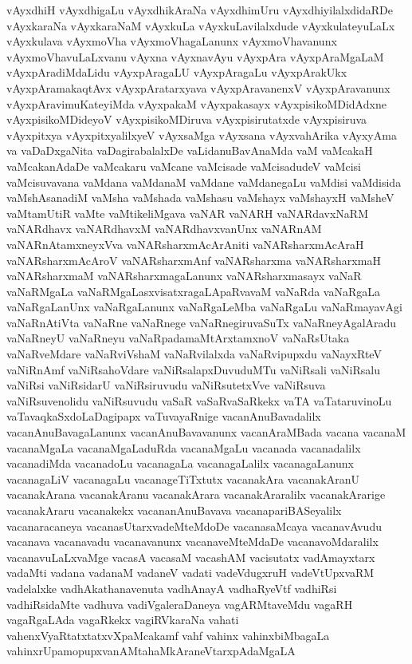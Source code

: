 {vAyxdhiH
vAyxdhigaLu
vAyxdhikAraNa
vAyxdhimUru
vAyxdhiyilalxdidaRDe
vAyxkaraNa
vAyxkaraNaM
vAyxkuLa
vAyxkuLavilalxdude
vAyxkulateyuLaLx
vAyxkulava
vAyxmoVha
vAyxmoVhagaLanunx
vAyxmoVhavanunx
vAyxmoVhavuLaLxvanu
vAyxna
vAyxnavAyu
vAyxpAra
vAyxpAraMgaLaM
vAyxpAradiMdaLidu
vAyxpAragaLU
vAyxpAragaLu
vAyxpArakUkx
vAyxpAramakaqtAvx
vAyxpAratarxyava
vAyxpAravanenxV
vAyxpAravanunx
vAyxpAravimuKateyiMda
vAyxpakaM
vAyxpakasayx
vAyxpisikoMDidAdxne
vAyxpisikoMDideyoV
vAyxpisikoMDiruva
vAyxpisirutatxde
vAyxpisiruva
vAyxpitxya
vAyxpitxyalilxyeV
vAyxsaMga
vAyxsana
vAyxvahArika
vAyxyAma
va
vaDaDxgaNita
vaDagirabalalxDe
vaLidanuBavAnaMda
vaM
vaMcakaH
vaMcakanAdaDe
vaMcakaru
vaMcane
vaMcisade
vaMcisadudeV
vaMcisi
vaMcisuvavana
vaMdana
vaMdanaM
vaMdane
vaMdanegaLu
vaMdisi
vaMdisida
vaMshAsanadiM
vaMsha
vaMshada
vaMshasu
vaMshayx
vaMshayxH
vaMsheV
vaMtamUtiR
vaMte
vaMtikeliMgava
vaNAR
vaNARH
vaNARdavxNaRM
vaNARdhavx
vaNARdhavxM
vaNARdhavxvanUnx
vaNARnAM
vaNARnAtamxneyxVva
vaNARsharxmAcArAniti
vaNARsharxmAcAraH
vaNARsharxmAcAroV
vaNARsharxmAnf
vaNARsharxma
vaNARsharxmaH
vaNARsharxmaM
vaNARsharxmagaLanunx
vaNARsharxmasayx
vaNaR
vaNaRMgaLa
vaNaRMgaLasxvisatxragaLApaRvavaM
vaNaRda
vaNaRgaLa
vaNaRgaLanUnx
vaNaRgaLanunx
vaNaRgaLeMba
vaNaRgaLu
vaNaRmayavAgi
vaNaRnAtiVta
vaNaRne
vaNaRnege
vaNaRnegiruvaSuTx
vaNaRneyAgalAradu
vaNaRneyU
vaNaRneyu
vaNaRpadamaMtArxtamxnoV
vaNaRsUtaka
vaNaRveMdare
vaNaRviVshaM
vaNaRvilalxda
vaNaRvipupxdu
vaNayxRteV
vaNiRnAmf
vaNiRsahoVdare
vaNiRsalapxDuvuduMTu
vaNiRsali
vaNiRsalu
vaNiRsi
vaNiRsidarU
vaNiRsiruvudu
vaNiRsutetxVve
vaNiRsuva
vaNiRsuvenolidu
vaNiRsuvudu
vaSaR
vaSaRvaSaRkekx
vaTA
vaTataruvinoLu
vaTavaqkaSxdoLaDagipapx
vaTuvayaRnige
vacanAnuBavadalilx
vacanAnuBavagaLanunx
vacanAnuBavavanunx
vacanAraMBada
vacana
vacanaM
vacanaMgaLa
vacanaMgaLaduRda
vacanaMgaLu
vacanada
vacanadalilx
vacanadiMda
vacanadoLu
vacanagaLa
vacanagaLalilx
vacanagaLanunx
vacanagaLiV
vacanagaLu
vacanageTiTxtutx
vacanakAra
vacanakAranU
vacanakArana
vacanakAranu
vacanakArara
vacanakAraralilx
vacanakArarige
vacanakAraru
vacanakekx
vacananAnuBavava
vacanapariBASeyalilx
vacanaracaneya
vacanasUtarxvadeMteMdoDe
vacanasaMcaya
vacanavAvudu
vacanava
vacanavadu
vacanavanunx
vacanaveMteMdaDe
vacanavoMdaralilx
vacanavuLaLxvaMge
vacasA
vacasaM
vacashAM
vacisutatx
vadAmayxtarx
vadaMti
vadana
vadanaM
vadaneV
vadati
vadeVdugxruH
vadeVtUpxvaRM
vadelalxke
vadhAkathanavenuta
vadhAnayA
vadhaRyeVtf
vadhiRsi
vadhiRsidaMte
vadhuva
vadiVgaleraDaneya
vagARMtaveMdu
vagaRH
vagaRgaLAda
vagaRkekx
vagiRVkaraNa
vahati
vahenxVyaRtatxtatxvXpaMcakamf
vahf
vahinx
vahinxbiMbagaLa
vahinxrUpamopupxvanAMtahaMkAraneVtarxpAdaMgaLA
}
